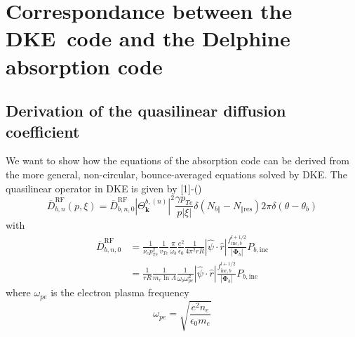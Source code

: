 

\section{\bigskip Correspondance between the DKE\ code and the Delphine
absorption code}

\subsection{Derivation of the quasilinear diffusion coefficient}

We want to show how the equations of the absorption code can be derived from
the more general, non-circular, bounce-averaged equations solved by DKE. The
quasilinear operator in DKE is given by [1]-()
\begin{equation}
\overline{D}_{b,n}^{\text{RF}}(p,\xi)=\overline{D}_{b,n,0}^{\text{RF}%
}\left\vert \Theta_{\mathbf{k}}^{b,\left(  n\right)  }\right\vert ^{2}%
\frac{\gamma p_{Te}}{p\left\vert \xi\right\vert }\delta\left(  N_{b\Vert
}-N_{\Vert\text{res}}\right)  2\pi\delta\left(  \theta-\theta_{b}\right)
\label{difcoeffnorm2}%
\end{equation}
with
\begin{align}
\overline{D}_{b,n,0}^{\text{RF}}  &  =\frac{1}{\nu_{e}p_{Te}^{2}}\frac
{1}{v_{Te}}\frac{\pi}{\omega_{b}}\frac{e^{2}}{\epsilon_{0}}\frac{1}{4\pi
^{2}rR}\left\vert \widehat{\psi}\cdot\widehat{r}\right\vert \frac
{f_{\text{inc},b}^{l+1/2}}{\left\vert \mathbf{\Phi}_{b}\right\vert
}P_{b,\text{inc}}\nonumber\\
&  =\frac{1}{rR}\frac{1}{m_{e}\ln\Lambda}\frac{1}{\omega_{b}\omega_{pe}^{2}%
}\left\vert \widehat{\psi}\cdot\widehat{r}\right\vert \frac{f_{\text{inc}%
,b}^{l+1/2}}{\left\vert \mathbf{\Phi}_{b}\right\vert }P_{b,\text{inc}}
\label{drf0}%
\end{align}
where $\omega_{pe}$ is the electron plasma frequency
\begin{equation}
\omega_{pe}=\sqrt{\frac{e^{2}n_{e}}{\epsilon_{0}m_{e}}}%
\end{equation}


